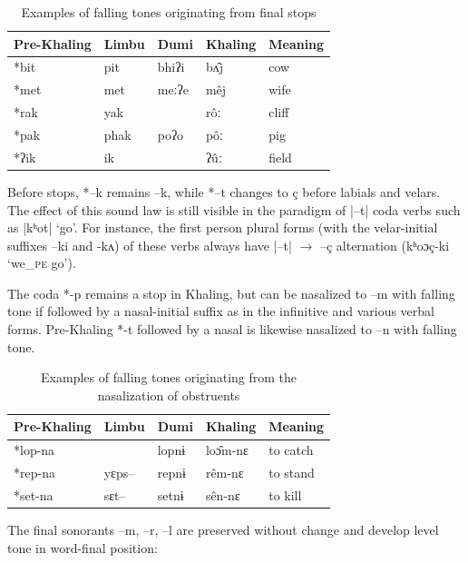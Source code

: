 \documentclass[oldfontcommands,oneside,a4paper,11pt]{article}
\newcommand{\ipa}[1]{{\phon \mbox{#1}}} %
\begin{document}
\begin{table}[H]
\caption{Examples of falling tones originating from final stops} \centering \label{tab:fall.stop}
\begin{tabular}{lllll}
\toprule
Pre-Khaling	&Limbu	&Dumi	&Khaling	&Meaning\\
\midrule
\ipa{*bit}	& \ipa{pit} &	\ipa{bhiʔi}	 & \ipa{bʌ̂j} &	cow\\
\ipa{*met} &	\ipa{met}	& \ipa{meːʔe} &	\ipa{mêj} &	wife\\
\ipa{*rak}	& \ipa{yak}	& &	\ipa{rôː}	& cliff \\
\ipa{*pak} &	\ipa{phak}	& \ipa{poʔo}	& \ipa{pôː}	& pig\\
\ipa{*ʔik}	& \ipa{ik}	& &	\ipa{ʔûː}	& field\\
\bottomrule
\end{tabular}
\end{table}
 
Before stops, \ipa{*--k} remains \ipa{--k}, while \ipa{*--t} changes to \ipa{ç} before labials and velars. The effect of this sound law  is still visible in the paradigm of  |--t| coda verbs such as |kʰot| `go'. For instance, the first person plural forms (with the velar-initial suffixes \ipa{--ki} and \ipa{-kʌ}) of these verbs always have |--t| $\rightarrow$ \ipa{--ç} alternation  (\ipa{kʰoɔç-ki} `we_{\textsc{pe}} go').

The coda \ipa{*-p} remains a stop in Khaling, but can be nasalized to \ipa{–m} with falling tone if followed by a nasal-initial suffix as in the infinitive and various verbal forms. Pre-Khaling \ipa{*-t} followed by a nasal is likewise nasalized to \ipa{--n} with falling tone.
\begin{table}[H]
\caption{Examples of falling tones originating from the nasalization of obstruents} \centering
\begin{tabular}{lllll}
\toprule
Pre-Khaling	&Limbu	&Dumi	&Khaling	&Meaning\\
\midrule
\ipa{*lop-na}	& & \ipa{lopnɨ}	 & \ipa{loɔ̂m-nɛ}	&to catch\\
\ipa{*rep-na}	&\ipa{yɛps--} & \ipa{repnɨ	}& \ipa{rêm-nɛ}	&to stand\\
\ipa{*set-na}	&  \ipa{sɛt--}& \ipa{setnɨ	}& \ipa{sên-nɛ}	&to kill\\
\bottomrule
\end{tabular}
\end{table}

The final sonorants \ipa{--m}, \ipa{--r}, \ipa{--l} are preserved without change and develop level tone in word-final position:
\end{document}
